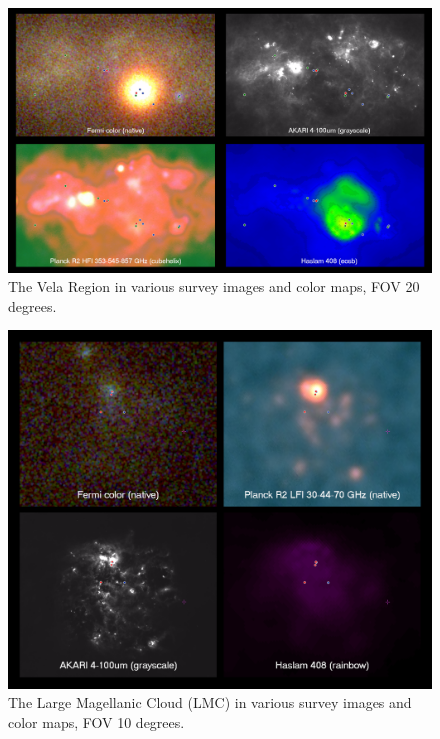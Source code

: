 \begin{figure}[tb]
  \centerline{\includegraphics[width=\textwidth]{figures/vela_region}}
  \caption{The Vela Region in various survey images and color maps, FOV 20 degrees.}
\end{figure}



\begin{figure}[tb]
  \centerline{\includegraphics[width=\textwidth]{figures/lmc_region}}
  \caption{The Large Magellanic Cloud (LMC) in various survey images and color maps, FOV 10 degrees.}
\end{figure}



